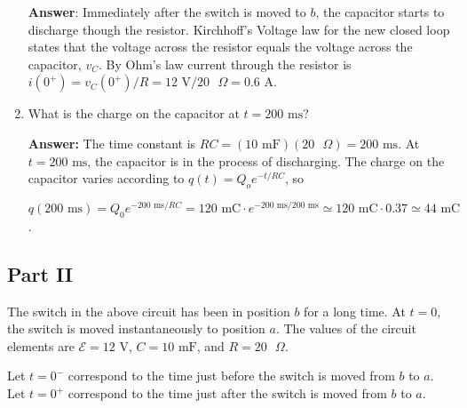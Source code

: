 \documentclass{article}
\begin{document}
\begin{enumerate}
        \ifsolutions
        \textbf{Answer}: Immediately after the switch is moved to $b$, the capacitor starts to discharge though the resistor. Kirchhoff's Voltage law for the new closed loop states that the voltage across the resistor equals the voltage across the capacitor, $v_C$. By Ohm's law current through the resistor is $i(0^+) = v_C(0^+)/R = 12\text{ V}/20\text{ }\Omega = 0.6\text{ A}$.
        \else
        \vskip 56.25pt
        \fi
        \ifsolutions\else
        \vskip 56.25pt
        \fi

  \item What is the charge on the capacitor at $t = 200\text{ ms}$?

        \ifsolutions
        {\bf Answer: } The time constant is $RC= (10\text{ mF}) (20\text{ }\Omega) = 200\text{ ms}$. At $t = 200\text{ ms}$, the capacitor is in the process of discharging. The charge on the capacitor varies according to $q(t)=Q_oe^{-t/RC}$, so

        $q(200\text{ ms}) = Q_0e^{-200\text{ ms}/RC} = 120\text{ mC} \cdot e^{-200\text{ ms}/200\text{ ms}} \simeq120\text{ mC}\cdot 0.37 \simeq 44 \text{ mC}$.
        \else

        \fi
        \ifsolutions\else

        \fi

\end{enumerate}

\newpage

\subsection{Part II}



The switch in the above circuit has been in position $b$ for a long time. At $t = 0$, the switch is moved instantaneously to position $a$. The values of the circuit elements are $\mathcal{E}= 12\text{ V}$, $C = 10\text{ mF}$, and $R = 20\text{ }\Omega$.

Let $t=0^-$ correspond to the time just before the switch is moved from $b$ to $a$. Let $t=0^+$ correspond to the time just after the switch is moved from $b$ to $a$.
\end{document}
